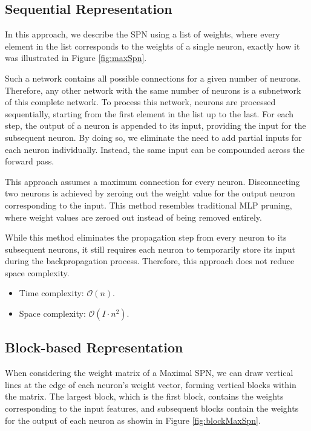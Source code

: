 \subsection{Sequential Representation}

In this approach, we describe the SPN using a list of weights, where every element in the list corresponds to the weights of a single neuron, exactly how it was illustrated in Figure \ref{fig:maxSpn}.
 
Such a network contains all possible connections for a given number of neurons. Therefore, any other network with the same number of neurons is a subnetwork of this complete network. To process this network, neurons are processed sequentially, starting from the first element in the list up to the last. For each step, the output of a neuron is appended to its input, providing the input for the subsequent neuron. By doing so, we eliminate the need to add partial inputs for each neuron individually. Instead, the same input can be compounded across the forward pass.

This approach assumes a maximum connection for every neuron. Disconnecting two neurons is achieved by zeroing out the weight value for the output neuron corresponding to the input. This method resembles traditional MLP pruning, where weight values are zeroed out instead of being removed entirely.

While this method eliminates the propagation step from every neuron to its subsequent neurons, it still requires each neuron to temporarily store its input during the backpropagation process. Therefore, this approach does not reduce space complexity.

\begin{itemize}
    \item Time complexity: $\mathcal{O}(n)$.
    \item Space complexity: $\mathcal{O}(I \cdot n^2)$.
\end{itemize}

\subsection{Block-based Representation}

When considering the weight matrix of a Maximal SPN, we can draw vertical lines at the edge of each neuron’s weight vector, forming vertical blocks within the matrix. The largest block, which is the first block, contains the weights corresponding to the input features, and subsequent blocks contain the weights for the output of each neuron as showin in Figure \ref{fig:blockMaxSpn}.
 
